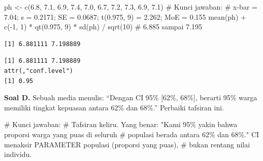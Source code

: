\documentclass[
  indonesian,
  letterpaper,
]{book}
\newenvironment{Shaded}{\begin{snugshade}}{\end{snugshade}}
\newcommand{\CommentTok}[1]{\textcolor[rgb]{0.37,0.37,0.37}{#1}}
\newcommand{\DecValTok}[1]{\textcolor[rgb]{0.68,0.00,0.00}{#1}}
\newcommand{\FloatTok}[1]{\textcolor[rgb]{0.68,0.00,0.00}{#1}}
\newcommand{\FunctionTok}[1]{\textcolor[rgb]{0.28,0.35,0.67}{#1}}
\newcommand{\NormalTok}[1]{\textcolor[rgb]{0.00,0.23,0.31}{#1}}
\newcommand{\OtherTok}[1]{\textcolor[rgb]{0.00,0.23,0.31}{#1}}
\newcommand{\SpecialCharTok}[1]{\textcolor[rgb]{0.37,0.37,0.37}{#1}}
\begin{document}
\begin{Shaded}
\begin{Highlighting}[]
\NormalTok{ph }\OtherTok{\textless{}{-}} \FunctionTok{c}\NormalTok{(}\FloatTok{6.8}\NormalTok{, }\FloatTok{7.1}\NormalTok{, }\FloatTok{6.9}\NormalTok{, }\FloatTok{7.4}\NormalTok{, }\FloatTok{7.0}\NormalTok{, }\FloatTok{6.7}\NormalTok{, }\FloatTok{7.2}\NormalTok{, }\FloatTok{7.3}\NormalTok{, }\FloatTok{6.9}\NormalTok{, }\FloatTok{7.1}\NormalTok{)}
\CommentTok{\# Kunci jawaban:}
\CommentTok{\# x{-}bar = 7.04; s = 0.2171; SE = 0.0687; t(0.975, 9) = 2.262; MoE = 0.155}
\FunctionTok{mean}\NormalTok{(ph) }\SpecialCharTok{+} \FunctionTok{c}\NormalTok{(}\SpecialCharTok{{-}}\DecValTok{1}\NormalTok{, }\DecValTok{1}\NormalTok{) }\SpecialCharTok{*} \FunctionTok{qt}\NormalTok{(}\FloatTok{0.975}\NormalTok{, }\DecValTok{9}\NormalTok{) }\SpecialCharTok{*} \FunctionTok{sd}\NormalTok{(ph) }\SpecialCharTok{/} \FunctionTok{sqrt}\NormalTok{(}\DecValTok{10}\NormalTok{)  }\CommentTok{\# 6.885 sampai 7.195}
\end{Highlighting}
\end{Shaded}

\begin{verbatim}
[1] 6.881111 7.198889
\end{verbatim}

\begin{Shaded}
\end{Shaded}

\begin{verbatim}
[1] 6.881111 7.198889
attr(,"conf.level")
[1] 0.95
\end{verbatim}

\textbf{Soal D.} Sebuah media menulis: ``Dengan CI 95\% {[}62\%,
68\%{]}, berarti 95\% warga memiliki tingkat kepuasan antara 62\% dan
68\%.'' Perbaiki tafsiran ini.

\begin{Shaded}
\begin{Highlighting}[]
\CommentTok{\# Kunci jawaban:}
\CommentTok{\# Tafsiran keliru. Yang benar: "Kami 95\% yakin bahwa proporsi warga yang puas di seluruh}
\CommentTok{\# populasi berada antara 62\% dan 68\%." CI menaksir PARAMETER populasi (proporsi yang puas),}
\CommentTok{\# bukan rentang nilai individu.}
\end{Highlighting}
\end{Shaded}
\end{document}

